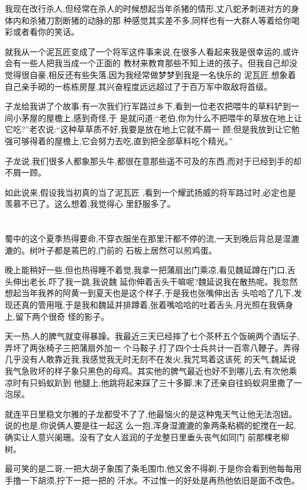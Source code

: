 ﻿\documentclass[12pt,twocolumn]{article}
\begin{document}
我现在改行杀人,但经常在杀人的时候想起当年杀猪的情形,丈八蛇矛刺进对方的身体内和杀猪刀割断猪的动脉的那
种感觉其实差不多,同样也有一大群人等着给你喝彩或者看你的笑话。

就我从一个泥瓦匠变成了一个将军这件事来说,在很多人看起来我是很幸运的,或许会有一些人把我当成一个正面的
教材来教育那些不知上进的孩子。但我自己却没觉得很自豪,相反还有些失落,因为我经常做梦梦到我是一名快乐的
泥瓦匠,想象着自己亲手砌的一栋栋房屋,其兴奋程度远远超过了于百万军中取敌将首级。

子龙给我讲了个故事:有一次我们行军路过乡下,看到一位老农把喂牛的草料铲到一间小茅屋的屋檐上,感到奇怪,于
是就问道:``老伯,你为什么不把喂牛的草放在地上让它吃?''老农说:``这种草草质不好,我要是放在地上它就不屑一
顾;但是我放到让它勉强可够得着的屋檐上,它会努力去吃,直到把全部草料吃个精光。''

子龙说,我们很多人都象那头牛,都很在意那些遥不可及的东西,而对于已经到手的却不屑一顾。

如此说来,假设我当初真的当了泥瓦匠 ,看到一个耀武扬威的将军路过时,必定也是羡慕不已了。这么想着,我觉得心
里舒服多了。

\section{}

蜀中的这个夏季热得要命,不穿衣服坐在那里汗都不停的流,一天到晚后背总是湿漉漉的。树叶子都是蔫巴的,门前的
石板上居然可以煎鸡蛋。

晚上能稍好一些,但也热得睡不着觉,我拿一把蒲扇出门乘凉,看见魏延蹲在门口,舌头伸出老长,吓了我一跳,我说魏
延你伸着舌头干嘛呢?魏延说我在散热呢。我忽然想起当年我养的阿黄一到夏天也是这个样子,于是我也张嘴伸出舌
头哈哈了几下,发现还真的管用哦,于是我和魏延并排蹲着,张着嘴哈哈的吐着舌头,月光照在我俩身上,留下两个很奇
怪的影子。

天一热,人的脾气就变得暴躁。我最近三天已经摔了七个茶杯五个饭碗两个酒坛子,弄坏了两张椅子三把蒲扇外加一
个马鞍子,打了四个士兵共计一百零八鞭子。弄得几乎没有人敢靠近我,我感觉我无时无刻不在发火,我咒骂着这该死
的天气,魏延说我气急败坏的样子象只黑色的母鸡。其实他的脾气最近也好不到哪儿去,有次他乘凉时有只蚂蚁趴到
他腿上,他跳将起来踩了三十多脚,末了还亲自往蚂蚁洞里撒了一泡尿。

就连平日里稳文尔雅的子龙都受不了了,他最恼火的是这种鬼天气让他无法泡妞。说的也是,你说俩人要是往一起这
么一抱,浑身湿漉漉的象两条粘稠的蛇搅在一起,确实让人意兴阑珊。没有了女人滋润的子龙整日里垂头丧气如同门
前那棵老柳树。

最可笑的是二哥,一把大胡子象围了条毛围巾,他又舍不得剃,于是你会看到他每每用手撸一下胡须,拧下一把一把的
汗水。不过惟一的好处是再热他依旧是面不改色。
\end{document}
